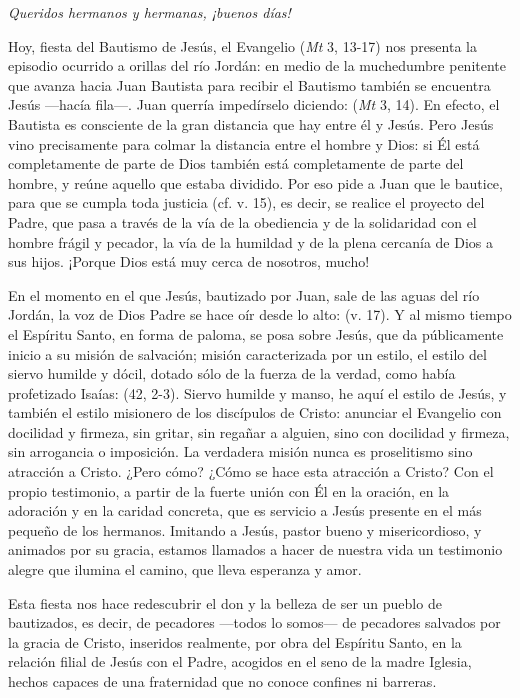 {\emph{Queridos hermanos y hermanas, ¡buenos días!}

Hoy, fiesta del Bautismo de Jesús, el Evangelio (\emph{Mt} 3, 13-17) nos presenta la episodio ocurrido a orillas del río Jordán: en medio de la muchedumbre penitente que avanza hacia Juan Bautista para recibir el Bautismo también se encuentra Jesús ---hacía fila---. Juan querría impedírselo diciendo:  (\emph{Mt} 3, 14). En efecto, el Bautista es consciente de la gran distancia que hay entre él y Jesús. Pero Jesús vino precisamente para colmar la distancia entre el hombre y Dios: si Él está completamente de parte de Dios también está completamente de parte del hombre, y reúne aquello que estaba dividido. Por eso pide a Juan que le bautice, para que se cumpla toda justicia (cf. v. 15), es decir, se realice el proyecto del Padre, que pasa a través de la vía de la obediencia y de la solidaridad con el hombre frágil y pecador, la vía de la humildad y de la plena cercanía de Dios a sus hijos. ¡Porque Dios está muy cerca de nosotros, mucho!

En el momento en el que Jesús, bautizado por Juan, sale de las aguas del río Jordán, la voz de Dios Padre se hace oír desde lo alto:  (v. 17). Y al mismo tiempo el Espíritu Santo, en forma de paloma, se posa sobre Jesús, que da públicamente inicio a su misión de salvación; misión caracterizada por un estilo, el estilo del siervo humilde y dócil, dotado sólo de la fuerza de la verdad, como había profetizado Isaías:  (42, 2-3). Siervo humilde y manso, he aquí el estilo de Jesús, y también el estilo misionero de los discípulos de Cristo: anunciar el Evangelio con docilidad y firmeza, sin gritar, sin regañar a alguien, sino con docilidad y firmeza, sin arrogancia o imposición. La verdadera misión nunca es proselitismo sino atracción a Cristo. ¿Pero cómo? ¿Cómo se hace esta atracción a Cristo? Con el propio testimonio, a partir de la fuerte unión con Él en la oración, en la adoración y en la caridad concreta, que es servicio a Jesús presente en el más pequeño de los hermanos. Imitando a Jesús, pastor bueno y misericordioso, y animados por su gracia, estamos llamados a hacer de nuestra vida un testimonio alegre que ilumina el camino, que lleva esperanza y amor.

Esta fiesta nos hace redescubrir el don y la belleza de ser un pueblo de bautizados, es decir, de pecadores ---todos lo somos--- de pecadores salvados por la gracia de Cristo, inseridos realmente, por obra del Espíritu Santo, en la relación filial de Jesús con el Padre, acogidos en el seno de la madre Iglesia, hechos capaces de una fraternidad que no conoce confines ni barreras.

}
